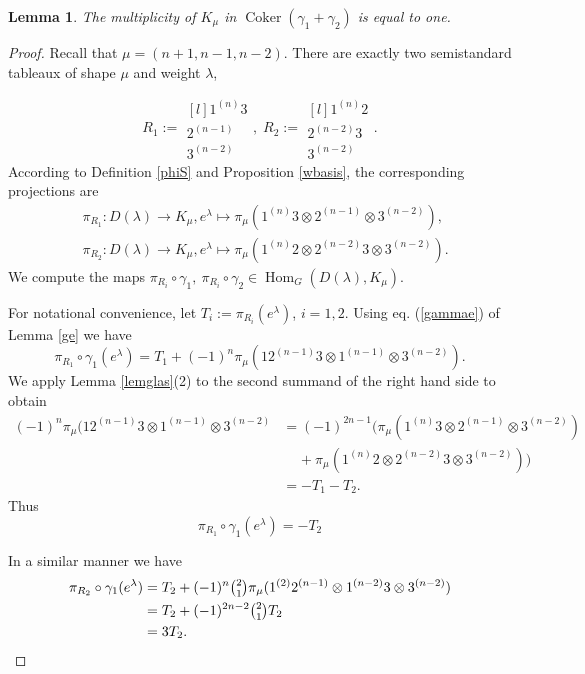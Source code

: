 \documentclass[11pt]{amsart}
\newtheorem{lem}[thm]{Lemma}
\theoremstyle{definition}
\numberwithin{equation}{section}
\DeclareMathOperator{\Hom}{Hom}
\DeclareMathOperator{\coker}{Coker}
\begin{document}
\begin{lem}\label{lemma2} The multiplicity of $K_{\mu}$ in $\coker{(\gamma_1 + \gamma_2)}$ is equal to one.
\end{lem}
\begin{proof}
	Recall that $\mu = (n+1,n-1,n-2)$. There are exactly two semistandard tableaux of shape $\mu$ and weight $\lambda$, 
	
	\[ R_1:=\begin{matrix*}[l]
		1^{(n)}3  \\
		2^{(n-1)} \\
		3^{(n-2)} \end{matrix*}, \;R_2:=\begin{matrix*}[l]
		1^{(n)}2  \\
		2^{(n-2)}3 \\
		3^{(n-2)} \end{matrix*}.  \]
	According to Definition \ref{phiS} and Proposition \ref{wbasis}, the corresponding projections are 	\begin{align*} &\pi_{R_1}:D(\lambda) \to K_\mu, e^{\lambda} \mapsto \pi_\mu(1^{(n)}3\otimes2^{(n-1)} \otimes 3^{(n-2)}), \\&\pi_{R_2}:D(\lambda) \to K_\mu, e^{\lambda} \mapsto \pi_\mu(1^{(n)}2\otimes2^{(n-2)}3 \otimes 3^{(n-2)}).\end{align*}
	We compute the maps $\pi_{R_i} \circ \gamma_1, \ \pi_{R_i} \circ \gamma_2 \in \Hom_G(D(\lambda), K_\mu)$. 
	
	For notational convenience, let $T_i:=\pi_{R_i}(e^\lambda)$, $i=1,2$. Using eq. (\ref{gammae}) of Lemma \ref {ge}  we have
	\[
		\pi_{R_1} \circ \gamma_1 (e^\lambda)=T_1+(-1)^n\pi_{\mu}(12^{(n-1)}3 \otimes 1^{(n-1)} \otimes 3^{(n-2)}).
	\]
	We apply Lemma \ref{lemglas}(2) to the second summand of the right hand side to obtain
	\begin{align*}
		(-1)^n\pi_{\mu}(12^{(n-1)}3 \otimes 1^{(n-1)} \otimes 3^{(n-2)}&=(-1)^{2n-1}\big(\pi_{\mu}(1^{(n)}3 \otimes 2^{(n-1)} \otimes 3^{(n-2)}) \\& \;\;\;\; + \pi_{\mu}(1^{(n)}2 \otimes 2^{(n-2)}3 \otimes 3^{(n-2)}) \big)\\&=-T_1-T_2.
	\end{align*}
	Thus \[\pi_{R_1} \circ \gamma_1 (e^\lambda)=-T_2\]
	
	
	
	In a similar manner we have \begin{align*}	\pi_{R_2} \circ \gamma_1 (e^\lambda)&=T_2+(-1)^n\tbinom{2}{1} \pi_{\mu}(1^{(2)}2^{(n-1)} \otimes 1^{(n-2)}3 \otimes 3^{(n-2)})\\&=T_2+(-1)^{2n-2}\tbinom{2}{1}T_2 \\&=3T_2.\end{align*}
	

\end{proof}
\end{document}
